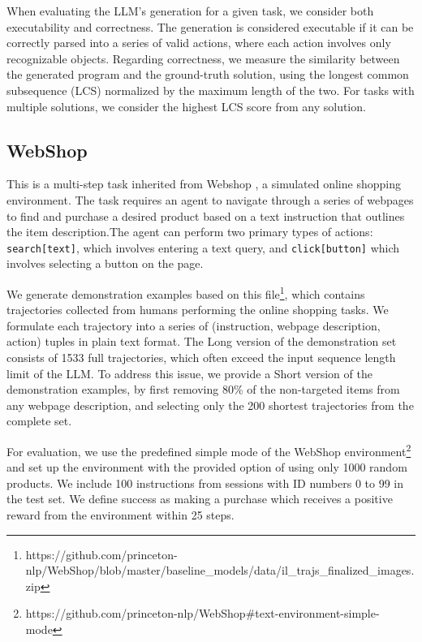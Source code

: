 When evaluating the LLM’s generation for a given task, we consider both executability and correctness. The generation is considered executable if it can be correctly parsed into a series of valid actions, where each action involves only recognizable objects. Regarding correctness, we measure the similarity between the generated program and the ground-truth solution, using the longest common subsequence (LCS) \cite{puig2018virtualhome} normalized by the maximum length of the two. For tasks with multiple solutions, we consider the highest LCS score from any solution.



\subsection{WebShop}

This is a multi-step task inherited from Webshop \cite{yao2023webshop}, a simulated online shopping environment. 
The task requires an agent to navigate through a series of webpages to find and purchase a desired product based on a text instruction that outlines the item description.The agent can perform two primary types of actions: \texttt{search[text]}, which involves entering a text query, and \texttt{click[button]} which involves selecting a button on the page.

We generate demonstration examples based on this file\footnote{https://github.com/princeton-nlp/WebShop/blob/master/baseline\_models/data/il\_trajs\_finalized\_images.zip}, which contains trajectories collected from humans performing the online shopping tasks. We formulate each trajectory into a series of (instruction, webpage description, action) tuples in plain text format. The Long version of the demonstration set consists of 1533 full trajectories, which often exceed the input sequence length limit of the LLM. To address this issue, we provide a Short version of the demonstration examples, by first removing 80\% of the non-targeted items from any webpage description, and selecting only the 200 shortest trajectories from the complete set.

For evaluation, we use the predefined simple mode of the WebShop environment\footnote{https://github.com/princeton-nlp/WebShop\#text-environment-simple-mode} and set up the environment with the provided option of using only 1000 random products. We include 100 instructions from sessions with ID numbers 0 to 99 in the test set. We define success as making a purchase which receives a positive reward from the environment within 25 steps. 

